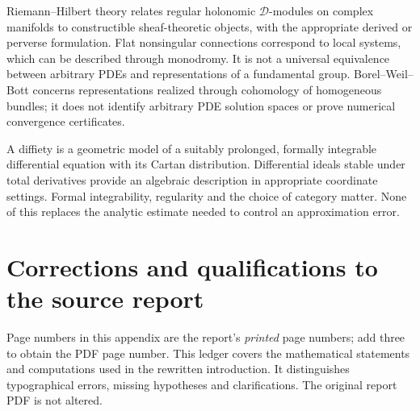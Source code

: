 \documentclass[11pt,a4paper]{article}
\numberwithin{equation}{section}
\theoremstyle{definition}
\theoremstyle{plain}
\theoremstyle{remark}
\begin{document}
Riemann--Hilbert theory relates regular holonomic $\mathcal D$-modules on complex manifolds to constructible sheaf-theoretic objects, with the appropriate derived or perverse formulation. Flat nonsingular connections correspond to local systems, which can be described through monodromy. It is not a universal equivalence between arbitrary PDEs and representations of a fundamental group. Borel--Weil--Bott concerns representations realized through cohomology of homogeneous bundles; it does not identify arbitrary PDE solution spaces or prove numerical convergence certificates.

A diffiety is a geometric model of a suitably prolonged, formally integrable differential equation with its Cartan distribution. Differential ideals stable under total derivatives provide an algebraic description in appropriate coordinate settings. Formal integrability, regularity and the choice of category matter. None of this replaces the analytic estimate needed to control an approximation error.

\appendix
\clearpage
\section{Corrections and qualifications to the source report}\label{app:source-errors}
Page numbers in this appendix are the report's \emph{printed} page numbers; add three to obtain the PDF page number. This ledger covers the mathematical statements and computations used in the rewritten introduction. It distinguishes typographical errors, missing hypotheses and clarifications. The original report PDF is not altered.
\end{document}
